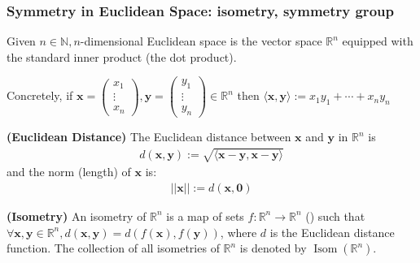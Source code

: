 \documentclass{article}
\newcommand{\bfs}[1]{\textbf{({#1}) }}
\begin{document}
\subsubsection{Symmetry in Euclidean Space: isometry, symmetry group}
\begin{defa}
Given $n \in \mathbb{N}, n$-dimensional Euclidean space is the vector space $\mathbb{R}^{n}$ equipped with the standard inner product (the dot product). 

\centerline{Concretely, if $\boldsymbol{x}=\left(\begin{array}{c}x_{1} \\ \vdots \\ x_{n}\end{array}\right), \boldsymbol{y}=\left(\begin{array}{c}y_{1} \\ \vdots \\ y_{n}\end{array}\right) \in \mathbb{R}^{n}$ then $\langle\boldsymbol{x}, \boldsymbol{y}\rangle:=x_{1} y_{1}+\cdots+x_{n} y_{n}$}
\end{defa} 
\begin{defa}{\bfs{Euclidean Distance}}\label{def:euc_dis}
The Euclidean distance between $\boldsymbol{x}$ and $\boldsymbol{y}$ in $\mathbb{R}^{n}$ is
\begin{align*}
d(\boldsymbol{x}, \boldsymbol{y}):=\sqrt{\langle\boldsymbol{x}-\boldsymbol{y}, \boldsymbol{x}-\boldsymbol{y}\rangle}
\end{align*}
and the  norm (length) of $\boldsymbol{x}$ is:
\begin{align*}
||\boldsymbol{x}||:=d(\boldsymbol{x}, \boldsymbol{0})
\end{align*}
\end{defa}
\begin{defa}{\bfs{Isometry}}
 An isometry of $\mathbb{R}^{n}$ is a map of sets $f: \mathbb{R}^{n} \rightarrow \mathbb{R}^{n}$ () such that $\forall \boldsymbol{x}, \boldsymbol{y} \in \mathbb{R}^{n}, d(\boldsymbol{x}, \boldsymbol{y})=d(f(\boldsymbol{x}), f(\boldsymbol{y}))$, where $d$ is the Euclidean distance function. The collection of all isometries of $\mathbb{R}^{n}$ is denoted by
$\operatorname{Isom}\left(\mathbb{R}^{n}\right)$.
\end{defa}
\end{document}
